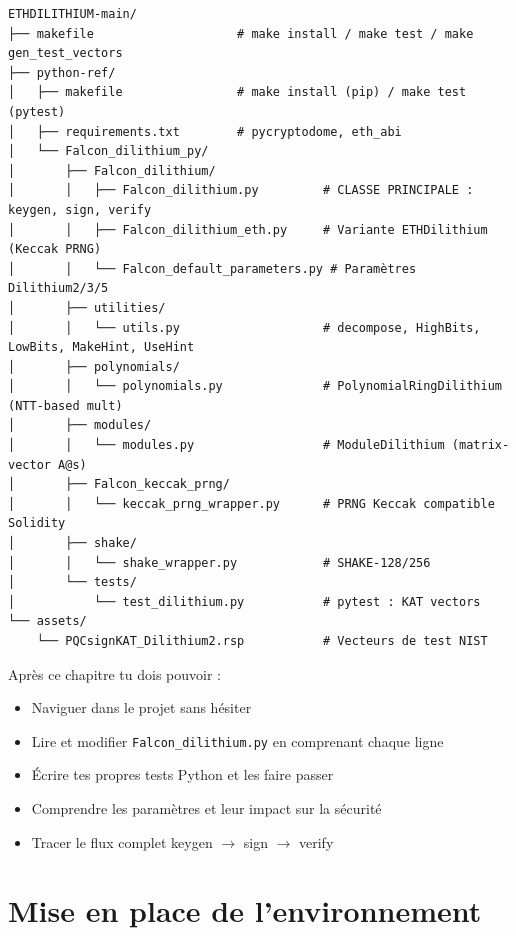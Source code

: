 \documentclass[12pt, a4paper]{article}
\begin{document}
\begin{tcolorbox}[colback=gray!5, colframe=gray!50, breakable]
\begin{verbatim}
ETHDILITHIUM-main/
├── makefile                    # make install / make test / make gen_test_vectors
├── python-ref/
│   ├── makefile                # make install (pip) / make test (pytest)
│   ├── requirements.txt        # pycryptodome, eth_abi
│   └── Falcon_dilithium_py/
│       ├── Falcon_dilithium/
│       │   ├── Falcon_dilithium.py         # CLASSE PRINCIPALE : keygen, sign, verify
│       │   ├── Falcon_dilithium_eth.py     # Variante ETHDilithium (Keccak PRNG)
│       │   └── Falcon_default_parameters.py # Paramètres Dilithium2/3/5
│       ├── utilities/
│       │   └── utils.py                    # decompose, HighBits, LowBits, MakeHint, UseHint
│       ├── polynomials/
│       │   └── polynomials.py              # PolynomialRingDilithium (NTT-based mult)
│       ├── modules/
│       │   └── modules.py                  # ModuleDilithium (matrix-vector A@s)
│       ├── Falcon_keccak_prng/
│       │   └── keccak_prng_wrapper.py      # PRNG Keccak compatible Solidity
│       ├── shake/
│       │   └── shake_wrapper.py            # SHAKE-128/256
│       └── tests/
│           └── test_dilithium.py           # pytest : KAT vectors
└── assets/
    └── PQCsignKAT_Dilithium2.rsp           # Vecteurs de test NIST
\end{verbatim}
\end{tcolorbox}

\begin{objetif}
Après ce chapitre tu dois pouvoir :
\begin{itemize}
  \item Naviguer dans le projet sans hésiter
  \item Lire et modifier \texttt{Falcon\_dilithium.py} en comprenant chaque ligne
  \item Écrire tes propres tests Python et les faire passer
  \item Comprendre les paramètres et leur impact sur la sécurité
  \item Tracer le flux complet keygen $\to$ sign $\to$ verify
\end{itemize}
\end{objetif}

\section{Mise en place de l'environnement}
\end{document}
